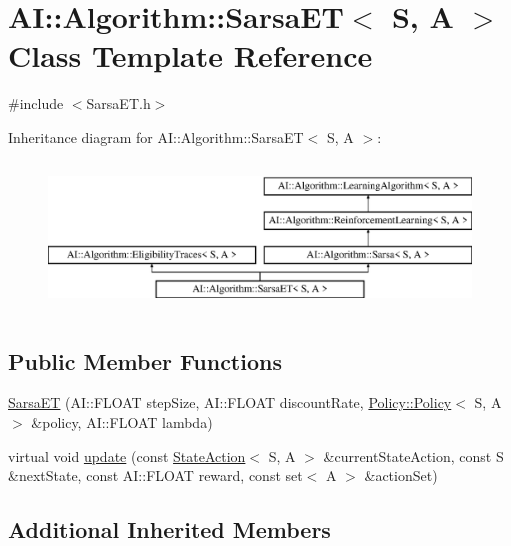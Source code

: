 \hypertarget{classAI_1_1Algorithm_1_1SarsaET}{\section{A\-I\-:\-:Algorithm\-:\-:Sarsa\-E\-T$<$ S, A $>$ Class Template Reference}
\label{classAI_1_1Algorithm_1_1SarsaET}
}


{\ttfamily \#include $<$Sarsa\-E\-T.\-h$>$}

Inheritance diagram for A\-I\-:\-:Algorithm\-:\-:Sarsa\-E\-T$<$ S, A $>$\-:\begin{figure}[H]
\begin{center}
\leavevmode
\includegraphics[height=4.000000cm]{classAI_1_1Algorithm_1_1SarsaET}
\end{center}
\end{figure}
\subsection*{Public Member Functions}
\begin{DoxyCompactItemize}
\item 
\hyperlink{classAI_1_1Algorithm_1_1SarsaET_aa934143376cc47c6e42e3ec67fb93eae}{Sarsa\-E\-T} (A\-I\-::\-F\-L\-O\-A\-T step\-Size, A\-I\-::\-F\-L\-O\-A\-T discount\-Rate, \hyperlink{classAI_1_1Algorithm_1_1Policy_1_1Policy}{Policy\-::\-Policy}$<$ S, A $>$ \&policy, A\-I\-::\-F\-L\-O\-A\-T lambda)
\item 
virtual void \hyperlink{classAI_1_1Algorithm_1_1SarsaET_adf13376b7ec8fdfa2b19ffadb1aa81e7}{update} (const \hyperlink{classAI_1_1StateAction}{State\-Action}$<$ S, A $>$ \&current\-State\-Action, const S \&next\-State, const A\-I\-::\-F\-L\-O\-A\-T reward, const set$<$ A $>$ \&action\-Set)
\end{DoxyCompactItemize}
\subsection*{Additional Inherited Members}


